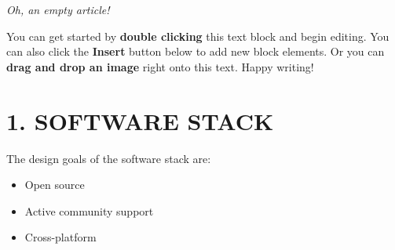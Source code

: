 \textit{Oh, an empty article!} 

You can get started by \textbf{double clicking} this text block and begin editing. You can also click the \textbf{Insert} button below to add new block elements. Or you can \textbf{drag and drop an image} right onto this text. Happy writing!

\section{1. SOFTWARE STACK}

The design goals of the software stack are:
\begin{itemize}
\item Open source
\item Active community support
\item Cross-platform
\end{itemize}


    